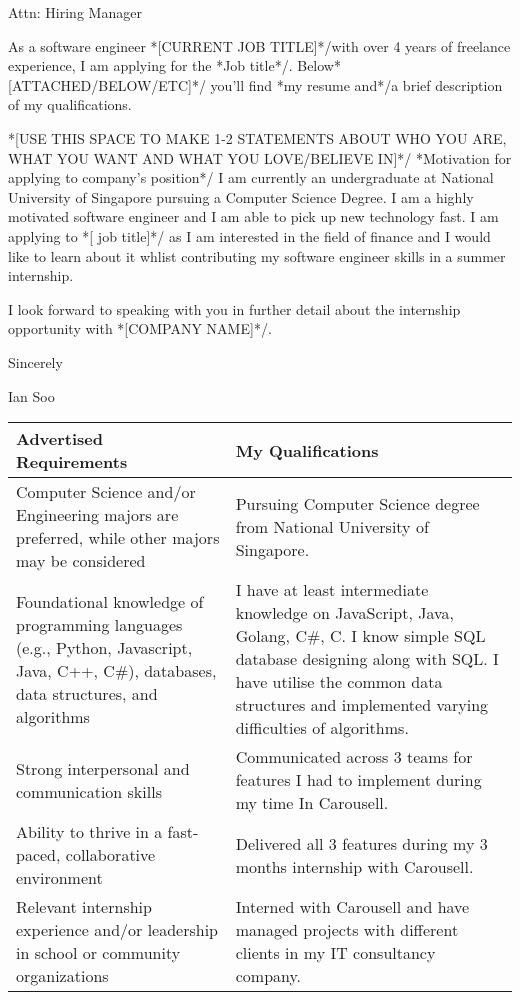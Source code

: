 \documentclass[11pt]{article} %
\begin{document}
\begin{flushleft}

Attn: Hiring Manager %

\bigskip

As a software engineer \/*[CURRENT JOB TITLE]*/with over 4 years of freelance experience, I am applying for the \/*Job title*/. Below\/*[ATTACHED/BELOW/ETC]*/ you'll find \/*my resume and*/a brief description of my qualifications.

\medskip

\/*[USE THIS SPACE TO MAKE 1-2 STATEMENTS ABOUT WHO YOU ARE, WHAT YOU WANT AND WHAT YOU LOVE/BELIEVE IN]*/
\/*Motivation for applying to company's position*/
I am currently an undergraduate at National University of Singapore pursuing a Computer Science Degree. I am a highly motivated software engineer and I am able to pick up new technology fast.
I am applying to \/*[ job title]*/ as I am interested in the field of finance and I would like to learn about it whlist contributing my software engineer skills in a summer internship.

\medskip

I look forward to speaking with you in further detail about the internship opportunity with \/*[COMPANY NAME]*/.

\bigskip

Sincerely

Ian Soo

\bigskip

\begin{table}[ht]
    \centering
    \begin{tabular}
    {
        >{\raggedright\arraybackslash}p{7cm} |
        >{\raggedright\arraybackslash}p{10cm}
    }
    \toprule
    \textbf{Advertised Requirements} & \textbf{My Qualifications}\\
    \midrule
    Computer Science and/or Engineering majors are preferred, while other majors may be considered & Pursuing Computer Science degree from National University of Singapore. \\
    \midrule
    Foundational knowledge of programming languages (e.g., Python, Javascript, Java, C++, C\#), databases, data structures, and algorithms & I have at least intermediate knowledge on JavaScript, Java, Golang, C\#, C. I know simple SQL database designing along with SQL. I have utilise the common data structures and implemented varying difficulties of algorithms. \\
    \midrule
    Strong interpersonal and communication skills & Communicated across 3 teams for features I had to implement during my time In Carousell. \\
    \midrule
    Ability to thrive in a fast-paced, collaborative environment & Delivered all 3 features during my 3 months internship with Carousell.  \\
    \midrule
    Relevant internship experience and/or leadership in school or community organizations & Interned with Carousell and have managed projects with different clients in my IT consultancy company. \\
    \bottomrule
    \end{tabular}
\end{table}

\end{flushleft}
\end{document}
